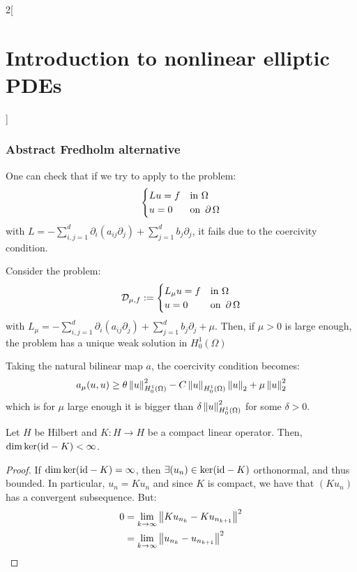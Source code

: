 \documentclass[../../../main_math.tex]{subfiles}
\begin{document}
\begin{multicols}{2}[\section{Introduction to nonlinear elliptic PDEs}]
  \subsubsection{Abstract Fredholm alternative}
  \begin{remark}
    One can check that if we try to apply  to the problem:
    $$
      \begin{cases}
        Lu=f & \text{in }\Omega      \\
        u=0  & \text{on }\operatorname{\partial}{\Omega}
      \end{cases}
    $$
    with $L=-\sum_{i,j=1}^d\partial_i(a_{ij}\partial_j)+\sum_{j=1}^db_j\partial_j$, it fails due to the coercivity condition.
  \end{remark}
  \begin{proposition}\label{INEPDE:Lmu}
    Consider the problem:
    $$
      \mathcal{D}_{\mu,f}:=\begin{cases}
        L_\mu u=f & \text{in }\Omega      \\
        u=0       & \text{on }\operatorname{\partial}{\Omega}
      \end{cases}
    $$
    with $L_\mu=-\sum_{i,j=1}^d\partial_i(a_{ij}\partial_j)+\sum_{j=1}^db_j\partial_j+\mu$. Then, if $\mu>0$ is large enough, the problem has a unique weak solution in $H_0^1(\Omega)$
  \end{proposition}
  \begin{sproof}
    Taking the natural bilinear map $a$, the coercivity condition becomes:
    $$
      a_\mu(u,u)\geq \theta \left\|u\right\|_{H_0^1(\Omega)}^2-C\left\|u\right\|_{H_0^1(\Omega)}\left\|u\right\|_2 + \mu \left\|u\right\|_2^2
    $$
    which is for $\mu$ large enough it is bigger than $\delta \left\|u\right\|_{H_0^1(\Omega)}^2$ for some $\delta>0$.
  \end{sproof}
  \begin{lemma}\label{INEPDE:lemma1_fredholm}
    Let $H$ be Hilbert and $K:H\to H$ be a compact linear operator. Then, $\dim \ker(\mathrm{id}-K)<\infty$.
  \end{lemma}
  \begin{proof}
    If $\dim\ker(\mathrm{id}-K)=\infty$, then $\exists (u_n)\in \ker(\mathrm{id}-K)$ orthonormal, and thus bounded. In particular, $u_n=Ku_n$ and since $K$ is compact, we have that $(Ku_n)$ has a convergent subsequence. But:
    \begin{align*}
      0 & =\lim_{k\to\infty}\norm{Ku_{n_k}-Ku_{n_{k+1}}}^2        \\
        & =\lim_{k\to\infty}\norm{u_{n_k}-u_{n_{k+1}}}^2          \\

\end{align*}
\end{proof}
\end{multicols}
\end{document}
